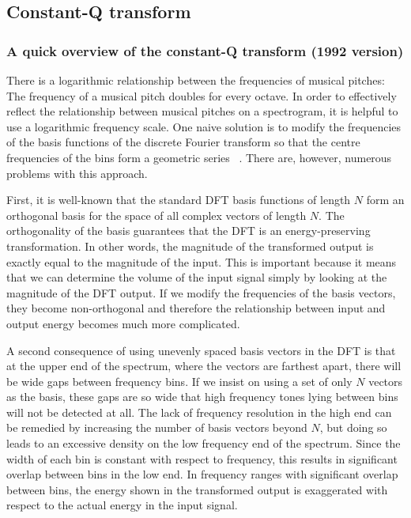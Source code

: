 \documentclass{ieeeaccess}
\begin{document}
\subsection{Constant-Q transform}
\subsubsection{A quick overview of the constant-Q transform (1992 version)}
There is a logarithmic relationship between the frequencies of musical pitches: The frequency of a musical pitch doubles for every octave. In order to effectively reflect the relationship between musical pitches on a spectrogram, it is helpful to use a logarithmic frequency scale. One naive solution is to modify the frequencies of the basis functions of the discrete Fourier transform so that the centre frequencies of the bins form a geometric series ~\cite{haines1988logarithmic}. There are, however, numerous problems with this approach. 


First, it is well-known that the standard DFT basis functions of length $N$ form an orthogonal basis for the space of all complex vectors of length $N$. The orthogonality of the basis guarantees that the DFT is an energy-preserving transformation. In other words, the magnitude of the transformed output is exactly equal to the magnitude of the input. This is important because it means that we can determine the volume of the input signal simply by looking at the magnitude of the DFT output. If we modify the frequencies of the basis vectors, they become non-orthogonal and therefore the relationship between input and output energy becomes much more complicated. 


A second consequence of using unevenly spaced basis vectors in the DFT is that at the upper end of the spectrum, where the vectors are farthest apart, there will be wide gaps between frequency bins. If we insist on using a set of only $N$ vectors as the basis, these gaps are so wide that high frequency tones lying between bins will not be detected at all.
The lack of frequency resolution in the high end can be remedied by increasing the number of basis vectors beyond $N$, but doing so leads to an excessive density on the low frequency end of the spectrum. Since the width of each bin is constant with respect to frequency, this results in significant overlap between bins in the low end. In frequency ranges with significant overlap between bins, the energy shown in the transformed output is exaggerated with respect to the actual energy in the input signal.
\end{document}
